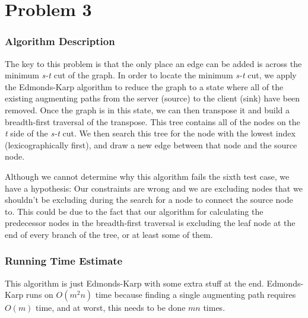 \documentclass{math}
\begin{document}
\section*{Problem 3}

\subsubsection*{Algorithm Description}
The key to this problem is that the only place an edge can be added is across
the minimum \emph{s-t} cut of the graph.  In order to locate the minimum
\emph{s-t} cut, we apply the Edmonds-Karp algorithm to reduce the graph to a
state where all of the existing augmenting paths from the server (source) to the
client (sink) have been removed.  Once the graph is in this state, we can then
transpose it and build a breadth-first traversal of the transpose.  This tree
contains all of the nodes on the \emph{t} side of the \emph{s-t} cut.  We then
search this tree for the node with the lowest index (lexicographically first),
and draw a new edge between that node and the source node.

Although we cannot determine why this algorithm fails the sixth test case, we
have a hypothesis: Our constraints are wrong and we are excluding nodes that
we shouldn't be excluding during the search for a node to connect the source
node to. This could be due to the fact that our algorithm for calculating the
predecessor nodes in the breadth-first traversal is excluding the leaf node at
the end of every branch of the tree, or at least some of them.

\subsubsection*{Running Time Estimate}
This algorithm is just Edmonds-Karp with some extra stuff at the end.
Edmonds-Karp runs on \( O(m^2n) \) time because finding a single augmenting path
requires \( O(m) \) time, and at worst, this needs to be done \( mn \) times.

\pagebreak
\end{document}
